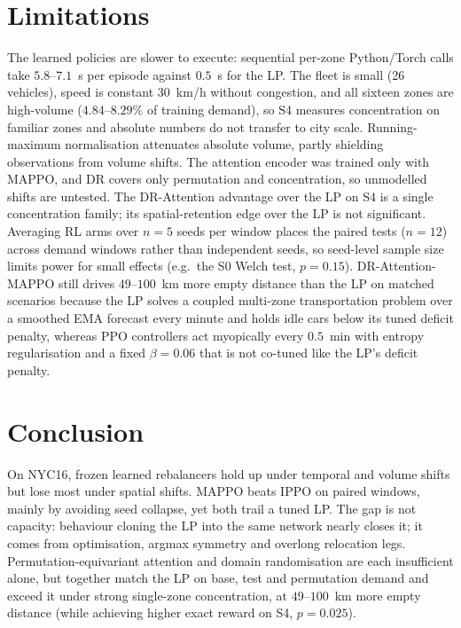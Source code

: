 \documentclass[3p,times,procedia]{elsarticle}
\begin{document}
\section{Limitations}
\label{sec:limitations}

The learned policies are slower to execute: sequential per-zone Python/Torch calls take $5.8$--$7.1$~s per episode against $0.5$~s for the LP. The fleet is small (26 vehicles), speed is constant 30~km/h without congestion, and all sixteen zones are high-volume ($4.84$--$8.29\%$ of training demand), so S4 measures concentration on familiar zones and absolute numbers do not transfer to city scale. Running-maximum normalisation attenuates absolute volume, partly shielding observations from volume shifts. The attention encoder was trained only with MAPPO, and DR covers only permutation and concentration, so unmodelled shifts are untested. The DR-Attention advantage over the LP on S4 is a single concentration family; its spatial-retention edge over the LP is not significant. Averaging RL arms over $n=5$ seeds per window places the paired tests ($n=12$) across demand windows rather than independent seeds, so seed-level sample size limits power for small effects (e.g.\ the S0 Welch test, $p=0.15$). DR-Attention-MAPPO still drives $49$--$100$~km more empty distance than the LP on matched scenarios because the LP solves a coupled multi-zone transportation problem over a smoothed EMA forecast every minute and holds idle cars below its tuned deficit penalty, whereas PPO controllers act myopically every $0.5$~min with entropy regularisation and a fixed $\beta=0.06$ that is not co-tuned like the LP's deficit penalty.

\section{Conclusion}
\label{sec:conclusion}

On NYC16, frozen learned rebalancers hold up under temporal and volume shifts but lose most under spatial shifts. MAPPO beats IPPO on paired windows, mainly by avoiding seed collapse, yet both trail a tuned LP. The gap is not capacity: behaviour cloning the LP into the same network nearly closes it; it comes from optimisation, argmax symmetry and overlong relocation legs. Permutation-equivariant attention and domain randomisation are each insufficient alone, but together match the LP on base, test and permutation demand and exceed it under strong single-zone concentration, at $49$--$100$~km more empty distance (while achieving higher exact reward on S4, $p=0.025$).
\end{document}
